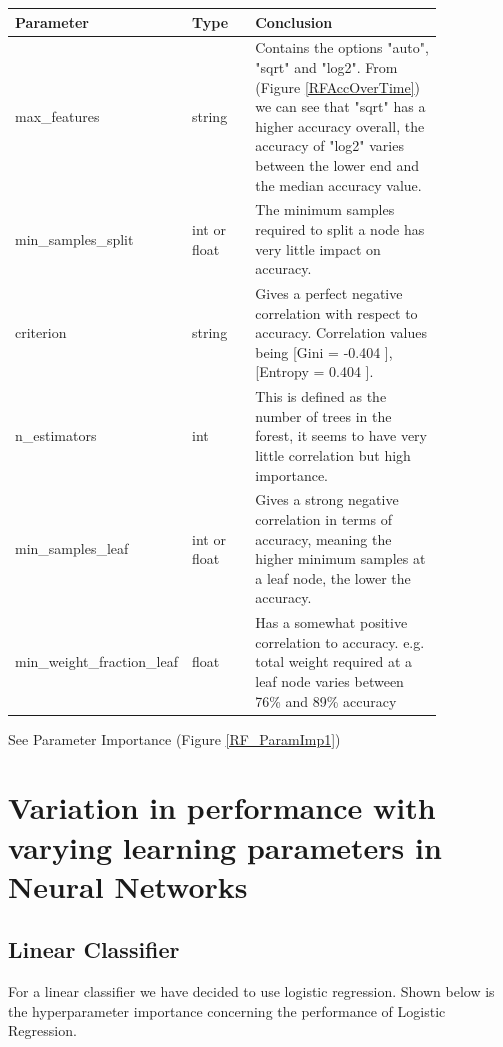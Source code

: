 \documentclass[11pt]{article}
\begin{document}
\begin{table}[ht]
  \centering
  \begin{tabular}{|p{0.25\linewidth} | p{0.15 \linewidth} | p{0.45\linewidth}|} 
    \hline
    \textbf{Parameter}  & \textbf{Type} & \textbf{Conclusion} \\ \hline
    max\_features & string & Contains the options "auto", "sqrt" and "log2". From (Figure \ref{RFAccOverTime}) we can see that "sqrt" has a higher accuracy overall, the accuracy of "log2" varies between the lower end and the median accuracy value.\\ \hline
    min\_samples\_split & int or float & The minimum samples required to split a node has very little impact on accuracy.  \\ \hline
    criterion & string & Gives a perfect negative correlation with respect to accuracy. Correlation values being [Gini = -0.404 ], [Entropy = 0.404 ]. \\ \hline
    n\_estimators & int & This is defined as the number of trees in the forest, it seems to have very little correlation but high importance. \\ \hline
    min\_samples\_leaf & int or float & Gives a strong negative correlation in terms of accuracy, meaning the higher minimum samples at a leaf node, the lower the accuracy. \\ \hline
    min\_weight\_fraction\_leaf & float & Has a somewhat positive correlation to accuracy. e.g. total weight required at a leaf node varies between 76\% and 89\% accuracy\\ \hline
  \end{tabular}
\end{table}\label{RF_Analysis_Table}
See Parameter Importance (Figure \ref{RF_ParamImp1})

\newpage
\section{Variation in performance with varying learning parameters in Neural Networks}
\subsection{Linear Classifier}

For a linear classifier we have decided to use logistic regression. 
Shown below is the hyperparameter importance concerning the performance of Logistic Regression.
\end{document}
